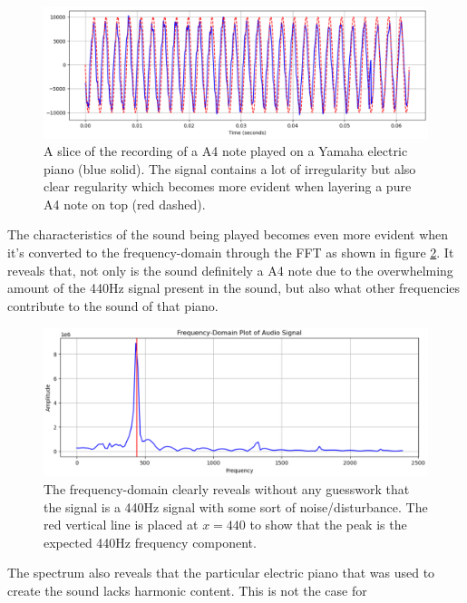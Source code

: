 
\begin{figure}[ht]
    \centering
    \includegraphics[width=\textwidth]{./images/piano_wave.png}
    \caption{A slice of the recording of a A4 note played on a Yamaha electric piano (blue solid). The signal contains a lot of irregularity but also clear regularity which becomes more evident when layering a pure A4 note on top (red dashed).\label{fig:pianoWave}}
\end{figure}

The characteristics of the sound being played becomes even more evident when it's converted to the frequency-domain through the FFT as shown in figure \ref{fig:pianoFreq}. It reveals that, not only is the sound definitely a A4 note due to the overwhelming amount of the 440Hz signal present in the sound, but also what other frequencies contribute to the sound of that piano. 

\begin{figure}[ht]
    \centering
    \includegraphics[width=\textwidth]{./images/piano_freq.png}
    \caption{The frequency-domain clearly reveals without any guesswork that the signal is a 440Hz signal with some sort of noise/disturbance. The red vertical line is placed at $x=440$ to show that the peak is the expected 440Hz frequency component.\label{fig:pianoFreq}}
\end{figure}

The spectrum also reveals that the particular electric piano that was used to create the sound lacks harmonic content. This is not the case for  

